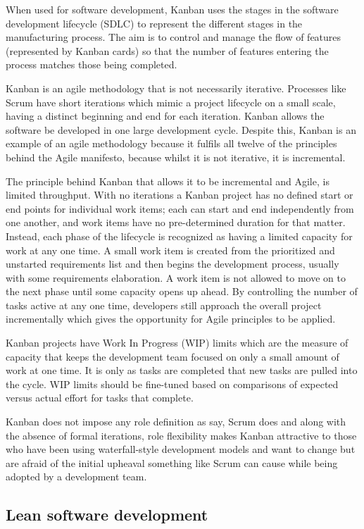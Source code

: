 \begin{spacing}{1.2}
When used for software development, Kanban uses the stages in the software development lifecycle (SDLC) to represent the different stages in the manufacturing process. The aim is to control and manage the flow of features (represented by Kanban cards) so that the number of features entering the process matches those being completed.

Kanban is an agile methodology that is not necessarily iterative. Processes like Scrum have short iterations which mimic a project lifecycle on a small scale, having a distinct beginning and end for each iteration. Kanban allows the software be developed in one large development cycle. Despite this, Kanban is an example of an agile methodology because it fulfils all twelve of the principles behind the Agile manifesto, because whilst it is not iterative, it is incremental.

The principle behind Kanban that allows it to be incremental and Agile, is limited throughput. With no iterations a Kanban project has no defined start or end points for individual work items; each can start and end independently from one another, and work items have no pre-determined duration for that matter. Instead, each phase of the lifecycle is recognized as having a limited capacity for work at any one time. A small work item is created from the prioritized and unstarted requirements list and then begins the development process, usually with some requirements elaboration. A work item is not allowed to move on to the next phase until some capacity opens up ahead. By controlling the number of tasks active at any one time, developers still approach the overall project incrementally which gives the opportunity for Agile principles to be applied.

Kanban projects have Work In Progress (WIP) limits which are the measure of capacity that keeps the development team focused on only a small amount of work at one time. It is only as tasks are completed that new tasks are pulled into the cycle. WIP limits should be fine-tuned based on comparisons of expected versus actual effort for tasks that complete.

Kanban does not impose any role definition as say, Scrum does and along with the absence of formal iterations, role flexibility makes Kanban attractive to those who have been using waterfall-style development models and want to change but are afraid of the initial upheaval something like Scrum can cause while being adopted by a development team.

\subsection{Lean software development}


\end{spacing}
